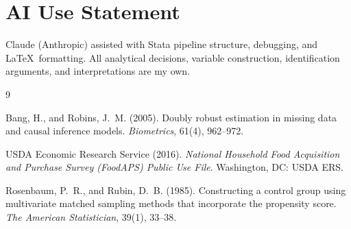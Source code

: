 \documentclass[12pt]{article}
\begin{document}
\section*{AI Use Statement}

Claude (Anthropic) assisted with Stata pipeline structure,
debugging, and \LaTeX\ formatting. All analytical decisions,
variable construction, identification arguments, and
interpretations are my own.


\begin{thebibliography}{9}

Bang, H., and Robins, J.~M. (2005).
Doubly robust estimation in missing data and causal inference
models.
\textit{Biometrics}, 61(4), 962--972.

USDA Economic Research Service (2016).
\textit{National Household Food Acquisition and Purchase Survey
(FoodAPS) Public Use File}. Washington, DC: USDA ERS.

Rosenbaum, P.~R., and Rubin, D.~B. (1985).
Constructing a control group using multivariate matched sampling
methods that incorporate the propensity score.
\textit{The American Statistician}, 39(1), 33--38.

\end{thebibliography}
\end{document}
